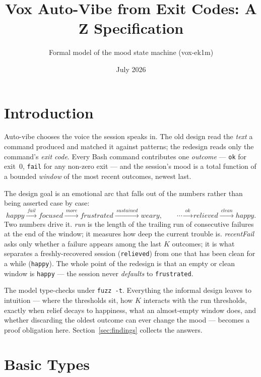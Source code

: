 \documentclass[a4paper,10pt,fleqn]{article}
\begin{document}
\title{Vox Auto-Vibe from Exit Codes: A Z Specification}
\author{Formal model of the mood state machine (vox-ek1m)}
\date{July 2026}
\maketitle

\tableofcontents
\newpage

\section{Introduction}

Auto-vibe chooses the voice the session speaks in. The old design read the
\emph{text} a command produced and matched it against patterns; the redesign
reads only the command's \emph{exit code}. Every Bash command contributes one
\emph{outcome} --- \texttt{ok} for exit~0, \texttt{fail} for any non-zero exit
--- and the session's mood is a total function of a bounded \emph{window} of the
most recent outcomes, newest last.

The design goal is an emotional arc that falls out of the numbers rather than
being asserted case by case:
\[
  happy \xrightarrow{\ fail\ } focused \xrightarrow{\ more\ } frustrated
  \xrightarrow{\ sustained\ } weary,
  \qquad
  \cdots \xrightarrow{\ ok\ } relieved \xrightarrow{\ clean\ } happy.
\]
Two numbers drive it. \emph{run} is the length of the trailing run of
consecutive failures at the end of the window; it measures how deep the current
trouble is. \emph{recentFail} asks only whether a failure appears among the last
$K$ outcomes; it is what separates a freshly-recovered session (\texttt{relieved})
from one that has been clean for a while (\texttt{happy}). The whole point of the
redesign is that an empty or clean window is \texttt{happy} --- the session never
\emph{defaults} to \texttt{frustrated}.

The model type-checks under \texttt{fuzz -t}. Everything the informal design
leaves to intuition --- where the thresholds sit, how $K$ interacts with the run
thresholds, exactly when relief decays to happiness, what an almost-empty window
does, and whether discarding the oldest outcome can ever change the mood ---
becomes a proof obligation here. Section~\ref{sec:findings} collects the answers.

\section{Basic Types}
\end{document}

